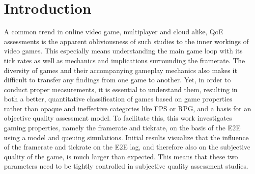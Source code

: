 \section{Introduction}
\label{sec:introduction}

A common trend in online video game, multiplayer and cloud alike, \gls{QoE} assessments is the apparent obliviousness of such studies to the inner workings of video games. This especially means understanding the main game loop with its tick rates as well as mechanics and implications surrounding the framerate. The diversity of games and their accompanying gameplay mechanics also makes it difficult to transfer any findings from one game to another. Yet, in order to conduct proper measurements, it is essential to understand them, resulting in both a better, quantitative classification of games based on game properties rather than opaque and ineffective categories like \gls{FPS} or \gls{RPG}, and a basis for an objective quality assessment model. To facilitate this, this work investigates gaming properties, namely the framerate and tickrate, on the basis of the \gls{E2E} using a model and queuing simulations. Initial results visualize that the influence of the framerate and tickrate on the \gls{E2E} lag, and therefore also on the subjective quality of the game, is much larger than expected. This means that these two parameters need to be tightly controlled in subjective quality assessment studies.

